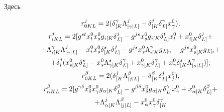 Здесь 


\begin{gather} 


r^j_{0K L}=2(\delta{}^\gamma_{[K}\Lambda{}^j_{|\gamma|L]}- 


\delta{}^j_{[K}\delta{}^\gamma_{L]}x^0_\gamma), \\ 


% 


r^j_{i K L}=2[g^{s t}x^0_t x^0_s g{}_{i[K} 


\delta{}^j_{L]}-g^{j s}x^0_s g{}_{i[K} 


\delta{}^t_{L]}x^0_t+x{}^0_{i[K}\delta{}^j_{L]}+\notag \\ 


% 


+\Lambda{}^\gamma_{i[K}\Lambda{}^j_{|\gamma|L]}- 


x^0_i x^0_s\delta{}^s_{[K}\delta{}^j_{L]}-g^{j s}x^0_s 


\Lambda{}^\gamma_{i[K}g{}_{L]\gamma}- 


g^{j s}x{}^0_{s[K}g{}_{L]i}+ \notag \\ 


% 


+\delta^j_i(x{}^0_{s[K}\delta{}^s_{L]}-x^0_s 


\Lambda{}^s_{\gamma[K}\delta{}^\gamma_{L]}+ 


x{}^0_{\gamma[K}\delta{}^\gamma_{L]}+x^0_\gamma 


\delta{}^s_{[K}\Lambda{}^\gamma_{|s|L]})]; \\ 


% 


r^\beta_{0K L}=2(\delta{}^j_{[K} 


\Lambda{}^\beta_{|j|L]}-\delta{}^\beta_{[K} 


\delta{}^j_{L]}x^0_j),\\ 


% 


r^\beta_{\alpha K L}=2[g^{\gamma\delta}x^0_\delta 


x^0_\gamma g{}_{\alpha[K}\delta{}^\beta_{L]}- 


g^{\beta\delta}x^0_\delta g{}_{\alpha[K} 


\delta{}^\gamma_{L]}x^0_\gamma+x{}^0_{\alpha[K} 


\delta{}^\beta_{L]}+\notag \\ 


+\Lambda{}^j_{\alpha[K}\Lambda{}^\beta_{|j|L]} 


-x^0_\alpha x^0_\gamma \delta{}^\gamma_{[K} 



\end{gather}
